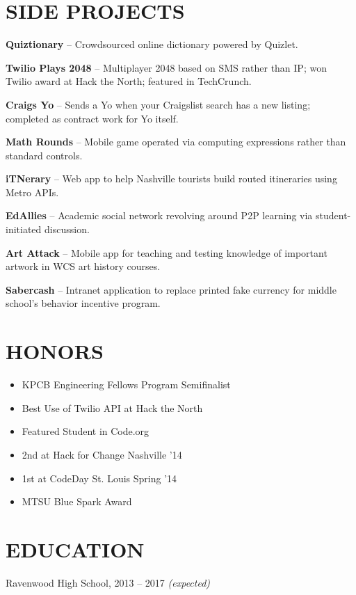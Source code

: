 \documentclass{res}
\begin{document}
\section{SIDE PROJECTS}

\textbf{Quiztionary} -- Crowdsourced online dictionary powered by Quizlet.

\textbf{Twilio Plays 2048} -- Multiplayer 2048 based on SMS rather than IP; won Twilio award at Hack the North; featured in TechCrunch.

\textbf{Craigs Yo} -- Sends a Yo when your Craigslist search has a new listing; completed as contract work for Yo itself.

\textbf{Math Rounds} -- Mobile game operated via computing expressions rather than standard controls.

\textbf{iTNerary} -- Web app to help Nashville tourists build routed itineraries using Metro APIs.

\textbf{EdAllies} -- Academic social network revolving around P2P learning via student-initiated discussion.

\textbf{Art Attack} -- Mobile app for teaching and testing knowledge of important artwork in WCS art history courses.

\textbf{Sabercash} -- Intranet application to replace printed fake currency for middle school's behavior incentive program.

\section{HONORS}

\begin{itemize} \itemsep -2pt
  \item KPCB Engineering Fellows Program Semifinalist
  \item Best Use of Twilio API at Hack the North
  \item Featured Student in Code.org
  \item 2nd at Hack for Change Nashville '14
  \item 1st at CodeDay St. Louis Spring '14
  \item MTSU Blue Spark Award
\end{itemize}

\section{EDUCATION}

Ravenwood High School, 2013 -- 2017 \textit {(expected)}
\end{document}
